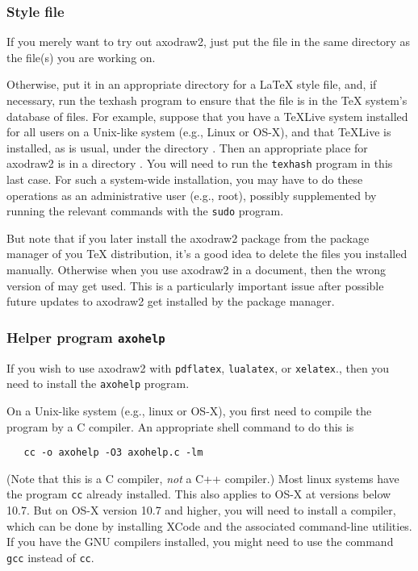 \documentclass[12pt]{article}
\def\program#1{\texttt{#1}}
\begin{document}
\subsubsection{Style file \protect{}}

If you merely want to try out axodraw2, just put the file
 in the same directory as the 
file(s) you are working on. 

Otherwise, put it in an appropriate directory for a \LaTeX{} style
file, and, if necessary, run the texhash program to ensure that the
file is in the \TeX{} system's database of files.  For example,
suppose that you have a TeXLive system installed for all users on a
Unix-like system (e.g., Linux or OS-X), and that TeXLive is installed,
as is usual, under the directory .  Then an
appropriate place for axodraw2 is in a directory
.  You will
need to run the \program{texhash} program in this last case.  For such
a system-wide installation, you may have to do these
operations as an administrative user (e.g., root), possibly
supplemented by running the relevant commands with the \program{sudo}
program.

But note that if you later install the axodraw2 package from the
package manager of you \TeX{} distribution, it's a good idea to delete
the files you installed manually.  Otherwise when you use axodraw2 in
a document, then the wrong version of  may get
used.  This is a particularly important issue after possible future
updates to axodraw2 get installed by the package manager.

\subsubsection{Helper program \program{axohelp}}
\label{sec:axohelp}

If you wish to use axodraw2 with \program{pdflatex}, \program{lualatex},
or \program{xelatex}., then you need to install the \program{axohelp}
program.

On a Unix-like system (e.g., linux or OS-X), you first need to compile
the program by a C compiler.  An appropriate shell command to do this
is
\begin{verbatim}
   cc -o axohelp -O3 axohelp.c -lm
\end{verbatim}
(Note that this is a C compiler, \emph{not} a C++ compiler.)  Most linux
systems have the program \program{cc} already installed.  This also applies to
OS-X at versions below 10.7.  But on OS-X version 10.7 and higher, you
will need to install a compiler, which can be done by installing XCode
and the associated command-line utilities.  If you have the GNU
compilers installed, you might need to use the command \program{gcc}
instead of \program{cc}.
\end{document}
